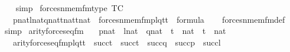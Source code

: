 \begin{isabellebody}
\ \ \isamarkupfalse%
\ simp%
\endisatagproof
{\isafoldproof}%
%
\isadelimproof
\isanewline
%
\endisadelimproof
\isanewline
{}\isamarkupfalse%
\ forces{\isacharunderscore}{\kern0pt}nmem{\isacharunderscore}{\kern0pt}fm{\isacharunderscore}{\kern0pt}type\ {\isacharbrackleft}{\kern0pt}TC{\isacharbrackright}{\kern0pt}{\isacharcolon}{\kern0pt}\isanewline
\ \ {\isachardoublequoteopen}{\isasymlbrakk}\ p{\isasymin}nat{\isacharsemicolon}{\kern0pt}l{\isasymin}nat{\isacharsemicolon}{\kern0pt}q{\isasymin}nat{\isacharsemicolon}{\kern0pt}t{}{\isasymin}nat{\isacharsemicolon}{\kern0pt}t{}{\isasymin}nat{\isasymrbrakk}\ {\isasymLongrightarrow}\ forces{\isacharunderscore}{\kern0pt}nmem{\isacharunderscore}{\kern0pt}fm{\isacharparenleft}{\kern0pt}p{\isacharcomma}{\kern0pt}l{\isacharcomma}{\kern0pt}q{\isacharcomma}{\kern0pt}t{}{\isacharcomma}{\kern0pt}t{}{\isacharparenright}{\kern0pt}\ {\isasymin}\ formula{\isachardoublequoteclose}\isanewline
%
\isadelimproof
\ \ %
\endisadelimproof
%
\isatagproof
{}\isamarkupfalse%
\ forces{\isacharunderscore}{\kern0pt}nmem{\isacharunderscore}{\kern0pt}fm{\isacharunderscore}{\kern0pt}def\isanewline
\ \ \isamarkupfalse%
\ simp%
\endisatagproof
{\isafoldproof}%
%
\isadelimproof
\isanewline
%
\endisadelimproof
\isanewline
{}\isamarkupfalse%
\ arity{\isacharunderscore}{\kern0pt}forces{\isacharunderscore}{\kern0pt}eq{\isacharunderscore}{\kern0pt}fm\ {\isacharcolon}{\kern0pt}\isanewline
\ \ {\isachardoublequoteopen}p{\isasymin}nat\ {\isasymLongrightarrow}\ l{\isasymin}nat\ {\isasymLongrightarrow}\ q{\isasymin}nat\ {\isasymLongrightarrow}\ t{}\ {\isasymin}\ nat\ {\isasymLongrightarrow}\ t{}\ {\isasymin}\ nat\ {\isasymLongrightarrow}\isanewline
\ \ \ arity{\isacharparenleft}{\kern0pt}forces{\isacharunderscore}{\kern0pt}eq{\isacharunderscore}{\kern0pt}fm{\isacharparenleft}{\kern0pt}p{\isacharcomma}{\kern0pt}l{\isacharcomma}{\kern0pt}q{\isacharcomma}{\kern0pt}t{}{\isacharcomma}{\kern0pt}t{}{\isacharparenright}{\kern0pt}{\isacharparenright}{\kern0pt}\ {\isacharequal}{\kern0pt}\ succ{\isacharparenleft}{\kern0pt}t{}{\isacharparenright}{\kern0pt}\ {\isasymunion}\ succ{\isacharparenleft}{\kern0pt}t{}{\isacharparenright}{\kern0pt}\ {\isasymunion}\ succ{\isacharparenleft}{\kern0pt}q{\isacharparenright}{\kern0pt}\ {\isasymunion}\ succ{\isacharparenleft}{\kern0pt}p{\isacharparenright}{\kern0pt}\ {\isasymunion}\ succ{\isacharparenleft}{\kern0pt}l{\isacharparenright}{\kern0pt}{\isachardoublequoteclose}\isanewline

\end{isabellebody}
